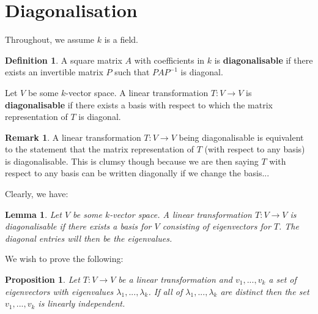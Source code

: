 \documentclass[12pt]{article}
\theoremstyle{plain}
\newtheorem{proposition}[thm]{Proposition}
\newtheorem{lemma}[thm]{Lemma}
\theoremstyle{definition}
\newtheorem{defn}[thm]{Definition} %
\newtheorem{remark}[thm]{Remark}
\newcommand{\lto}{\longrightarrow}
\begin{document}
\section{Diagonalisation}
Throughout, we assume $k$ is a field.
\begin{defn}\label{def:diagonalisable}
A square matrix $A$ with coefficients in $k$ is \textbf{diagonalisable} if there exists an invertible matrix $P$ such that $PAP^{-1}$ is diagonal.

Let $V$ be some $k$-vector space. A linear transformation $T: V \lto V$ is \textbf{diagonalisable} if there exists a basis with respect to which the matrix representation of $T$ is diagonal.
\end{defn}
\begin{remark}
A linear transformation $T: V \lto V$ being diagonalisable is equivalent to the statement that the matrix representation of $T$ (with respect to any basis) is diagonalisable. This is clumsy though because we are then saying $T$ with respect to any basis can be written diagonally if we change the basis...
\end{remark}
Clearly, we have:
\begin{lemma}\label{lem:diagonalisable}
Let $V$ be some $k$-vector space.  A linear transformation $T: V \lto V$ is diagonalisable if there exists a basis for $V$ consisting of eigenvectors for $T$. The diagonal entries will then be the eigenvalues.
\end{lemma}
We wish to prove the following:
\begin{proposition}\label{prop:linear_indep_dinstinct_eig}
Let $T: V \lto V$ be a linear transformation and $v_1,...,v_k$ a set of eigenvectors with eigenvalues $\lambda_1,...,\lambda_k$. If all of $\lambda_1,...,\lambda_k$ are distinct then the set $v_1,...,v_k$ is linearly independent.
\end{proposition}
\end{document}
